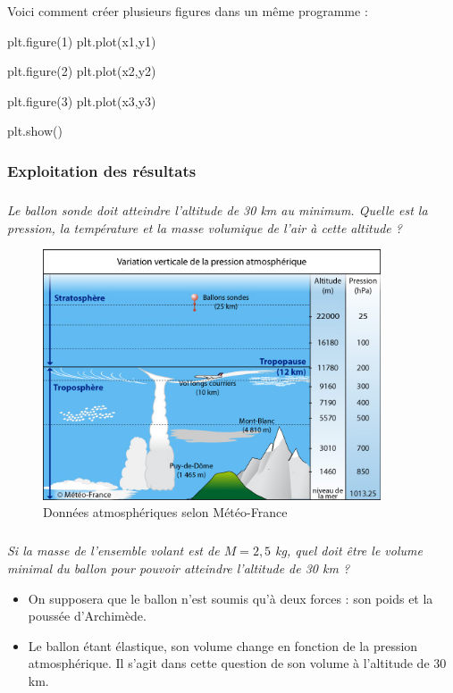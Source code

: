 \documentclass[10pt]{article}
\begin{document}
\begin{rem}
Voici comment créer plusieurs figures dans un même programme :
\begin{py}
\begin{python}
plt.figure(1)
plt.plot(x1,y1)		

plt.figure(2)
plt.plot(x2,y2)

plt.figure(3)
plt.plot(x3,y3)

plt.show()
\end{python}
\end{py} 
\end{rem}


\subsubsection*{Exploitation des résultats}

\subparagraph{}
\textit{Le ballon sonde doit atteindre l'altitude de 30 km au minimum. Quelle est la pression, la température et la masse volumique de l'air à cette altitude ?}

\begin{figure}
\centering
\includegraphics[width=10cm]{images/meteofrance.jpg}
\caption{Données atmosphériques selon Météo-France}\label{fig:meteo-france}
\end{figure} 

\subparagraph{}
\textit{Si la masse de l'ensemble volant est de $M=2,5$ kg, quel doit être le volume minimal du ballon pour pouvoir atteindre l'altitude de 30 km ? }

\begin{rem}
\begin{itemize}
\item On supposera que le ballon n'est soumis qu'à deux forces : son poids et la poussée d'Archimède.
\item Le ballon étant élastique, son volume change en fonction de la pression atmosphérique. Il s'agit dans cette question de son volume à l'altitude de 30 km.
\end{itemize}
\end{rem}
\end{document}
